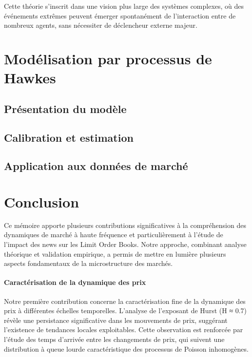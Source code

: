 \documentclass[12pt,a4paper]{article}
\theoremstyle{definition}
\theoremstyle{remark}
\begin{document}
Cette théorie s'inscrit dans une vision plus large des systèmes complexes, où des événements extrêmes peuvent émerger spontanément de l'interaction entre de nombreux agents, sans nécessiter de déclencheur externe majeur.

\section{Modélisation par processus de Hawkes}

\subsection{Présentation du modèle}

\subsection{Calibration et estimation}

\subsection{Application aux données de marché}

\section*{Conclusion}

Ce mémoire apporte plusieurs contributions significatives à la compréhension des dynamiques de marché à haute fréquence et particulièrement à l'étude de l'impact des news sur les Limit Order Books. Notre approche, combinant analyse théorique et validation empirique, a permis de mettre en lumière plusieurs aspects fondamentaux de la microstructure des marchés.

\paragraph{\textbf{Caractérisation de la dynamique des prix}} Notre première contribution concerne la caractérisation fine de la dynamique des prix à différentes échelles temporelles. L'analyse de l'exposant de Hurst (H ≈ 0.7) révèle une persistance significative dans les mouvements de prix, suggérant l'existence de tendances locales exploitables. Cette observation est renforcée par l'étude des temps d'arrivée entre les changements de prix, qui suivent une distribution à queue lourde caractéristique des processus de Poisson inhomogènes.
\end{document}
